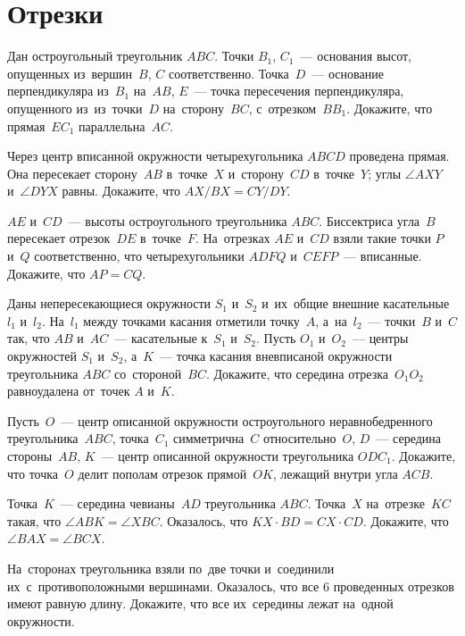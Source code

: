 
\section*{Отрезки}


\begin{problems}

\item
Дан остроугольный треугольник $ABC$.
Точки $B_1$, $C_1$~--- основания высот, опущенных из~вершин~$B$, $C$
соответственно.
Точка~$D$~--- основание перпендикуляра из~$B_1$ на~$AB$, $E$~--- точка
пересечения перпендикуляра, опущенного из~из~точки~$D$ на~сторону~$BC$,
с~отрезком~$B B_1$.
Докажите, что прямая~$E C_1$ параллельна~$AC$.

\item
Через центр вписанной окружности четырехугольника $ABCD$ проведена прямая.
Она пересекает сторону~$AB$ в~точке~$X$ и~сторону~$CD$ в~точке~$Y$;
углы $\angle AXY$ и~$\angle DYX$ равны.
Докажите, что $AX / BX = CY / DY$.

\item
$AE$ и~$CD$~--- высоты остроугольного треугольника $ABC$.
Биссектриса угла~$B$ пересекает отрезок~$DE$ в~точке~$F$.
На~отрезках $AE$ и~$CD$ взяли такие точки $P$ и~$Q$ соответственно,
что четырехугольники $ADFQ$ и~$CEFP$~--- вписанные.
Докажите, что $AP = CQ$.

\item
Даны непересекающиеся окружности $S_1$ и~$S_2$ и~их~общие внешние
касательные $l_1$ и~$l_2$.
На~$l_1$ между точками касания отметили точку~$A$, а~на~$l_2$~--- точки~$B$
и~$C$ так, что $AB$ и~$AC$~--- касательные к~$S_1$ и~$S_2$.
Пусть $O_1$ и~$O_2$~--- центры окружностей $S_1$ и~$S_2$, а~$K$~--- точка
касания вневписаной окружности треугольника $ABC$ со~стороной~$BC$.
Докажите, что середина отрезка~$O_1 O_2$ равноудалена от~точек $A$ и~$K$.

\item
Пусть~$O$~--- центр описанной окружности остроугольного неравнобедренного
треугольника~$ABC$, точка~$C_1$ симметрична~$C$ относительно~$O$,
$D$~--- середина стороны~$AB$, $K$~--- центр описанной окружности
треугольника $O D C_1$.
Докажите, что точка~$O$ делит пополам отрезок прямой~$OK$, лежащий внутри
угла $ACB$.

\item
Точка~$K$~--- середина чевианы~$AD$ треугольника $ABC$.
Точка~$X$ на~отрезке~$KC$ такая, что $\angle ABK = \angle XBC$.
Оказалось, что $KX \cdot BD = CX \cdot CD$.
Докажите, что $\angle BAX = \angle BCX$.

\item
На~сторонах треугольника взяли по~две точки и~соединили их~с~противоположными
вершинами.
Оказалось, что все 6 проведенных отрезков имеют равную длину.
Докажите, что все их~середины лежат на~одной окружности.

\end{problems}

